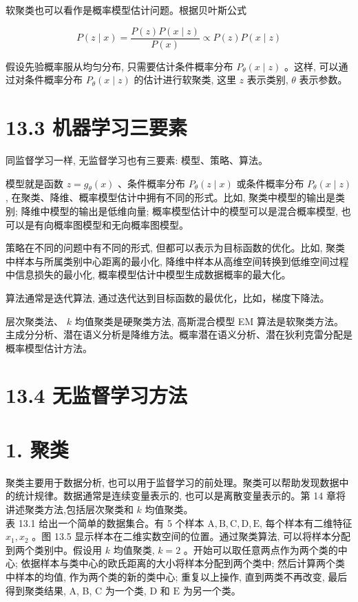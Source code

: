 \documentclass[10pt]{article}
\begin{document}
\begin{CJK*}{UTF8}{bsmi}
软聚类也可以看作是概率模型估计问题。根据贝叶斯公式


\begin{equation*}
P(z \mid x)=\frac{P(z) P(x \mid z)}{P(x)} \propto P(z) P(x \mid z) \tag{13.1}
\end{equation*}


假设先验概率服从均匀分布, 只需要估计条件概率分布 $P_{\theta}(x \mid z)$ 。这样, 可以通过对条件概率分布 $P_{\theta}(x \mid z)$ 的估计进行软聚类, 这里 $z$ 表示类别, $\theta$ 表示参数。

\section*{13.3 机器学习三要素}
同监督学习一样, 无监督学习也有三要素: 模型、策略、算法。

模型就是函数 $z=g_{\theta}(x)$ 、条件概率分布 $P_{\theta}(z \mid x)$ 或条件概率分布 $P_{\theta}(x \mid z)$, 在聚类、降维、概率模型估计中拥有不同的形式。比如, 聚类中模型的输出是类别; 降维中模型的输出是低维向量; 概率模型估计中的模型可以是混合概率模型, 也可以是有向概率图模型和无向概率图模型。

策略在不同的问题中有不同的形式, 但都可以表示为目标函数的优化。比如, 聚类中样本与所属类别中心距离的最小化, 降维中样本从高维空间转换到低维空间过程中信息损失的最小化, 概率模型估计中模型生成数据概率的最大化。

算法通常是迭代算法, 通过迭代达到目标函数的最优化，比如，梯度下降法。

层次聚类法、 $k$ 均值聚类是硬聚类方法, 高斯混合模型 EM 算法是软聚类方法。主成分分析、潜在语义分析是降维方法。概率潜在语义分析、潜在狄利克雷分配是概率模型估计方法。

\section*{13.4 无监督学习方法}
\section*{1. 聚类}
聚类主要用于数据分析, 也可以用于监督学习的前处理。聚类可以帮助发现数据中的统计规律。数据通常是连续变量表示的, 也可以是离散变量表示的。第 14 章将讲述聚类方法,包括层次聚类和 $k$ 均值聚类。\\
表 13.1 给出一个简单的数据集合。有 5 个样本 $\mathrm{A}, \mathrm{B}, \mathrm{C}, \mathrm{D}, \mathrm{E}$, 每个样本有二维特征 $x_{1}, x_{2}$ 。图 13.5 显示样本在二维实数空间的位置。通过聚类算法, 可以将样本分配到两个类别中。假设用 $k$ 均值聚类, $k=2$ 。开始可以取任意两点作为两个类的中心; 依据样本与类中心的欧氏距离的大小将样本分配到两个类中; 然后计算两个类中样本的均值, 作为两个类的新的类中心; 重复以上操作, 直到两类不再改变, 最后得到聚类结果, A, B, C 为一个类, D 和 $\mathrm{E}$ 为另一个类。


\end{CJK*}
\end{document}
